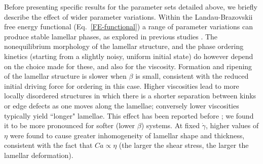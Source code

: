\documentclass[8.5pt,twoside,twocolumn]{article}
\begin{document}
\label{results2D}
Before presenting specific results for the parameter sets detailed above, we briefly describe the effect of wider parameter variations.
Within the Landau-Brazovskii free energy functional (Eq.~\ref{FE-functional}) a range of parameter variations can produce stable lamellar phases, as explored in previous studies \cite{Kendon01,Kumaran2001,Xu03, Xu06b,Kumaran2011}.
The nonequilibrium morphology of the lamellar structure, and the phase ordering kinetics (starting from a slightly noisy, uniform initial state) do however depend on the choice made for these, and also for the viscosity. 
Formation and ripening of the lamellar structure is slower when $\beta$ is small, consistent with the reduced initial driving force for ordering in this case. Higher viscosities lead to more locally disordered structures in which there is a shorter separation between kinks or edge defects as one moves along the lamellae; conversely lower viscosities typically yield ``longer" lamellae.
This effect has been reported before \cite{Gonnella97}; we found it to be more pronounced for softer (lower $\beta$) systems. At fixed $\dot\gamma$, higher values of $\eta$ were found to cause greater inhomogeneity of lamellar shape and thickness, consistent with the fact that $Ca\propto\eta$ (the larger the shear stress, the larger the lamellar deformation). 
\end{document}
